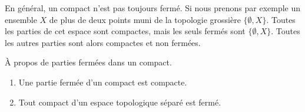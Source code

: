 \begin{example}
	En général, un compact n'est pas toujours fermé. Si nous prenons par exemple un ensemble \( X\) de plus de deux points muni de la topologie grossière \( \{ \emptyset,X \}\). Toutes les parties de cet espace sont compactes, mais les seuls fermés sont \( \{ \emptyset,X \}\). Toutes les autres parties sont alors compactes et non fermées.
\end{example}


\begin{lemma}   \label{LemnAeACf}
	À propos de parties fermées dans un compact.
	\begin{enumerate}
		\item       \label{ITEMooNKAKooQoNddr}
		      Une partie fermée d'un compact est compacte.
		\item       \label{ITEMooAZWVooLyPDeY}
		      Tout compact d'un espace topologique séparé est fermé.
	\end{enumerate}
\end{lemma}

